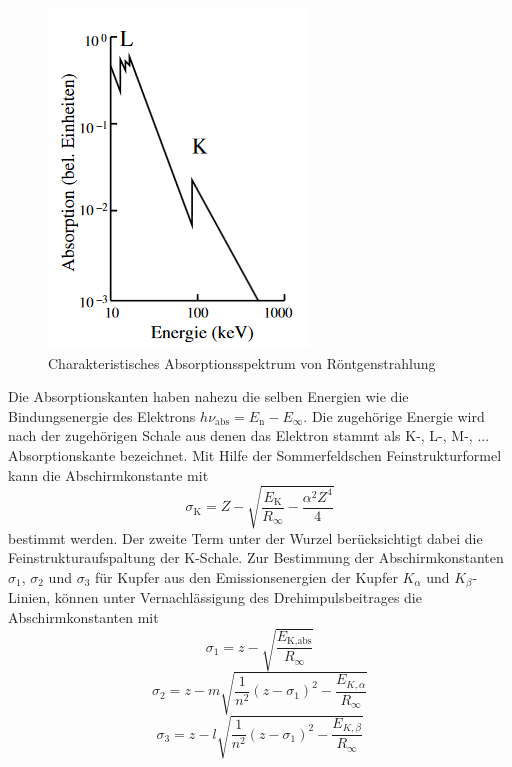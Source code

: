 \begin{figure}
    \centering
    \caption{Charakteristisches Absorptionsspektrum von Röntgenstrahlung \cite{V602}}
    \label{fig:abso}
    \includegraphics[width = 0.6 \textwidth]{pics/abso.png}
\end{figure}
Die Absorptionskanten haben nahezu die selben Energien wie die Bindungsenergie des Elektrons $h \nu_\text{abs}= E_\text{n} - E_{\infty}$. Die zugehörige Energie wird nach der zugehörigen Schale aus denen das Elektron stammt als K-, L-, M-, ... Absorptionskante bezeichnet. 
Mit Hilfe der Sommerfeldschen Feinstrukturformel kann die Abschirmkonstante mit
\begin{equation}
    \sigma_\text{K}=Z-\sqrt{\frac{E_\text{K}}{R_{\infty}}-\frac{\alpha^2 Z^4}{4}}
    \label{eqn:abschirmkonstante}
\end{equation}
bestimmt werden. Der zweite Term unter der Wurzel berücksichtigt dabei die Feinstrukturaufspaltung der K-Schale.
Zur Bestimmung der Abschirmkonstanten $\sigma_1$, $\sigma_2$ und $\sigma_3$ für Kupfer aus den Emissionsenergien der Kupfer $K_\alpha$ und $K_\beta$-Linien, können unter Vernachlässigung des Drehimpulsbeitrages die Abschirmkonstanten mit
\begin{equation}
    \sigma_1=z-\sqrt{\frac{E_\text{K,abs}}{R_\infty}}
    \label{eqn:si1}
\end{equation}
\begin{equation}
    \sigma_2=z- m \sqrt{\frac{1}{n^2} (z- \sigma_1)^2-\frac{E_{K,\alpha}}{R_\infty}}
    \label{eqn:si2}
\end{equation}
\begin{equation}
    \sigma_3=z- l \sqrt{\frac{1}{n^2} (z- \sigma_1)^2-\frac{E_{K,\beta}}{R_\infty}}
    \label{eqn:si3}
\end{equation}
